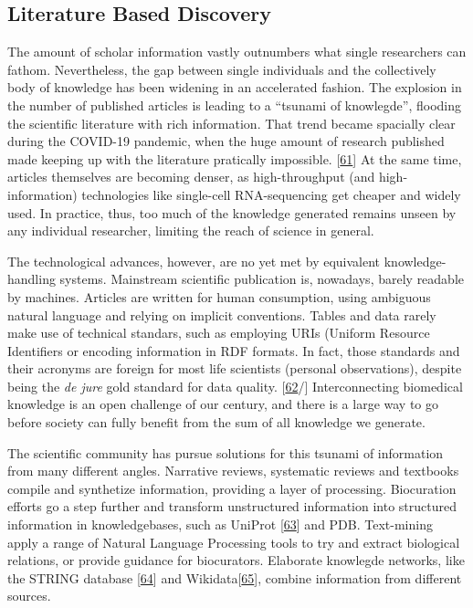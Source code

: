 \hypertarget{literature-based-discovery}{%
\subsection{Literature Based Discovery}\label{literature-based-discovery}}

The amount of scholar information vastly outnumbers what single researchers can fathom.
Nevertheless, the gap between single individuals and the collectively body of knowledge has been widening in
an accelerated fashion.
The explosion in the number of published articles is leading to a ``tsunami of knowlegde'',
flooding the scientific literature with rich information.
That trend became spacially clear during the COVID-19 pandemic, when the huge amount of research published made keeping up with the literature pratically impossible. {[}\protect\hyperlink{ref-oVsnSEwQ}{61}{]}
At the same time, articles themselves are becoming denser, as high-throughput (and high-information) technologies
like single-cell RNA-sequencing get cheaper and widely used.
In practice, thus, too much of the knowledge generated remains unseen by any individual researcher, limiting the reach of science in general.

The technological advances, however, are no yet met by equivalent knowledge-handling systems.
Mainstream scientific publication is, nowadays, barely readable by machines.
Articles are written for human consumption, using ambiguous natural language and relying on implicit conventions.
Tables and data rarely make use of technical standars, such as employing URIs (Uniform Resource Identifiers or encoding information in RDF formats.
In fact, those standards and their acronyms are foreign for most life scientists (personal observations), despite
being the \emph{de jure} gold standard for data quality. {[}\protect\hyperlink{ref-UI1dtNSw}{62}/{]}
Interconnecting biomedical knowledge is an open challenge of our century, and there is a large way to go
before society can fully benefit from the sum of all knowledge we generate.

The scientific community has pursue solutions for this tsunami of information from many different angles.
Narrative reviews, systematic reviews and textbooks compile and synthetize information, providing a layer of processing.
Biocuration efforts go a step further and transform unstructured information into structured information
in knowledgebases, such as UniProt {[}\protect\hyperlink{ref-1F9v68m9B}{63}{]} and PDB.
Text-mining apply a range of Natural Language Processing tools to try and extract biological relations,
or provide guidance for biocurators.
Elaborate knowlegde networks, like the STRING database {[}\protect\hyperlink{ref-POzqtz7B}{64}{]} and Wikidata{[}\protect\hyperlink{ref-3GqlN9Dk}{65}{]},
combine information from different sources.

